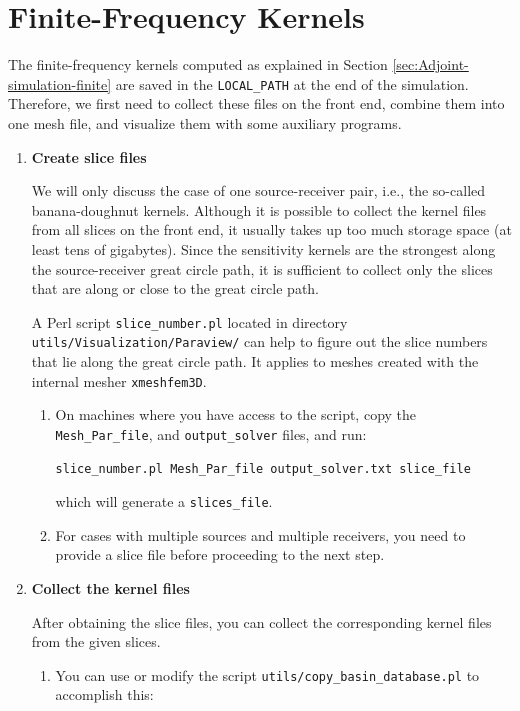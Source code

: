 \section{Finite-Frequency Kernels}\label{sec:Finite-Frequency-Kernels}

The finite-frequency kernels computed as explained in Section \ref{sec:Adjoint-simulation-finite}
are saved in the \texttt{LOCAL\_PATH} at the end of the simulation.
Therefore, we first need to collect these files on the front end,
combine them into one mesh file, and visualize them with some auxiliary
programs.
\begin{enumerate}
\item \textbf{Create slice files}


We will only discuss the case of one source-receiver pair, i.e., the
so-called banana-doughnut kernels. Although it is possible to collect
the kernel files from all slices on the front end, it usually takes
up too much storage space (at least tens of gigabytes). Since the
sensitivity kernels are the strongest along the source-receiver great
circle path, it is sufficient to collect only the slices that are
along or close to the great circle path.


A Perl script \texttt{slice\_number.pl} located in directory \texttt{utils/Visualization/Paraview/}
can help to figure out the slice numbers that lie along the great
circle path. It applies to meshes created with the internal mesher
\texttt{xmeshfem3D}.
\begin{enumerate}
\item On machines where you have access to the script, copy the \texttt{Mesh\_Par\_file},
and \texttt{output\_solver} files, and run:

{\small
\begin{verbatim}
slice_number.pl Mesh_Par_file output_solver.txt slice_file
\end{verbatim}
}
which will generate a \texttt{slices\_file}.

\item For cases with multiple sources and multiple receivers, you need to
provide a slice file before proceeding to the next step.
\end{enumerate}
\item \textbf{Collect the kernel files}


After obtaining the slice files, you can collect the corresponding
kernel files from the given slices.
\begin{enumerate}
\item You can use or modify the script \texttt{utils/copy\_basin\_database.pl}
to accomplish this:


\end{enumerate}
\end{enumerate}

